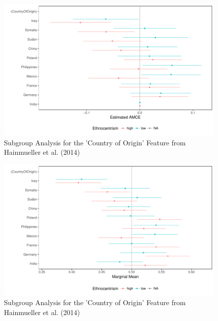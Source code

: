 \documentclass[a4paper,12pt]{article}\usepackage[]{graphicx}\usepackage[]{color}
\makeatletter
\def\maxwidth{ %
  \ifdim\Gin@nat@width>\linewidth
    \linewidth
  \else
    \Gin@nat@width
  \fi
}
\newenvironment{knitrout}{}{} %
\makeatother
\begin{document}
\begin{knitrout}
\color{fgcolor}\begin{figure}
\includegraphics[width=\maxwidth]{figure/subgroup_results-1} \caption[Subgroup Analysis for the 'Country of Origin' Feature from Hainmueller et al]{Subgroup Analysis for the 'Country of Origin' Feature from Hainmueller et al. (2014)}\label{fig:subgroup_results1}
\end{figure}

\begin{figure}
\includegraphics[width=\maxwidth]{figure/subgroup_results-2} \caption[Subgroup Analysis for the 'Country of Origin' Feature from Hainmueller et al]{Subgroup Analysis for the 'Country of Origin' Feature from Hainmueller et al. (2014)}\label{fig:subgroup_results2}
\end{figure}


\end{knitrout}
\end{document}
